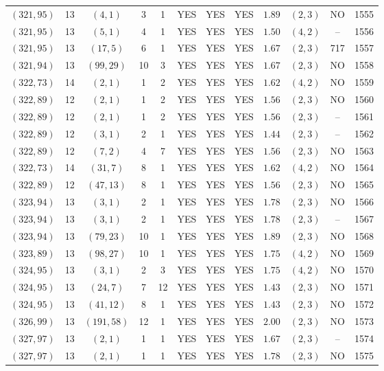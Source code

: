 \begin{longtable}{|c|c|c|c|c|c|c|c|c|c|c|c|}
$(321,95)$ & 13 & $(4,1)$ & 3 & 1 & YES & YES & YES & $1.89$ & $(2,3)$ & NO & 1555\\
$(321,95)$ & 13 & $(5,1)$ & 4 & 1 & YES & YES & YES & $1.50$ & $(4,2)$ & -- & 1556\\
$(321,95)$ & 13 & $(17,5)$ & 6 & 1 & YES & YES & YES & $1.67$ & $(2,3)$ & 717 & 1557\\
$(321,94)$ & 13 & $(99,29)$ & 10 & 3 & YES & YES & YES & $1.67$ & $(2,3)$ & NO & 1558\\
$(322,73)$ & 14 & $(2,1)$ & 1 & 2 & YES & YES & YES & $1.62$ & $(4,2)$ & NO & 1559\\
$(322,89)$ & 12 & $(2,1)$ & 1 & 2 & YES & YES & YES & $1.56$ & $(2,3)$ & NO & 1560\\
$(322,89)$ & 12 & $(2,1)$ & 1 & 2 & YES & YES & YES & $1.56$ & $(2,3)$ & -- & 1561\\
$(322,89)$ & 12 & $(3,1)$ & 2 & 1 & YES & YES & YES & $1.44$ & $(2,3)$ & -- & 1562\\
$(322,89)$ & 12 & $(7,2)$ & 4 & 7 & YES & YES & YES & $1.56$ & $(2,3)$ & NO & 1563\\
$(322,73)$ & 14 & $(31,7)$ & 8 & 1 & YES & YES & YES & $1.62$ & $(4,2)$ & NO & 1564\\
$(322,89)$ & 12 & $(47,13)$ & 8 & 1 & YES & YES & YES & $1.56$ & $(2,3)$ & NO & 1565\\
$(323,94)$ & 13 & $(3,1)$ & 2 & 1 & YES & YES & YES & $1.78$ & $(2,3)$ & NO & 1566\\
$(323,94)$ & 13 & $(3,1)$ & 2 & 1 & YES & YES & YES & $1.78$ & $(2,3)$ & -- & 1567\\
$(323,94)$ & 13 & $(79,23)$ & 10 & 1 & YES & YES & YES & $1.89$ & $(2,3)$ & NO & 1568\\
$(323,89)$ & 13 & $(98,27)$ & 10 & 1 & YES & YES & YES & $1.75$ & $(4,2)$ & NO & 1569\\
$(324,95)$ & 13 & $(3,1)$ & 2 & 3 & YES & YES & YES & $1.75$ & $(4,2)$ & NO & 1570\\
$(324,95)$ & 13 & $(24,7)$ & 7 & 12 & YES & YES & YES & $1.43$ & $(2,3)$ & NO & 1571\\
$(324,95)$ & 13 & $(41,12)$ & 8 & 1 & YES & YES & YES & $1.43$ & $(2,3)$ & NO & 1572\\
$(326,99)$ & 13 & $(191,58)$ & 12 & 1 & YES & YES & YES & $2.00$ & $(2,3)$ & NO & 1573\\
$(327,97)$ & 13 & $(2,1)$ & 1 & 1 & YES & YES & YES & $1.67$ & $(2,3)$ & -- & 1574\\
$(327,97)$ & 13 & $(2,1)$ & 1 & 1 & YES & YES & YES & $1.78$ & $(2,3)$ & NO & 1575\\

\end{longtable}

